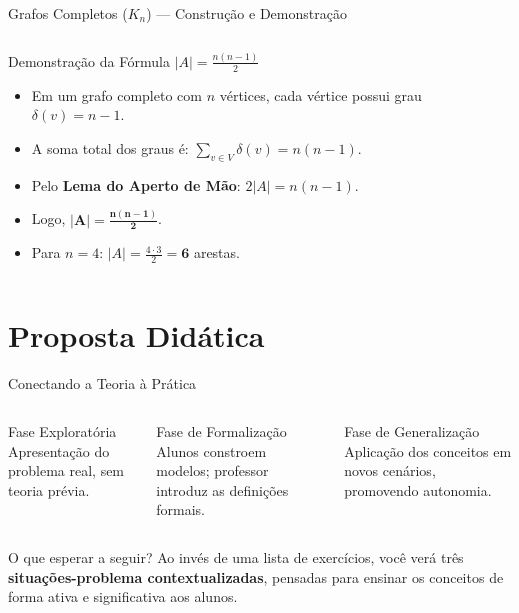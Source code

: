 \documentclass[10pt]{beamer}
\begin{document}
\begin{frame}{Grafos Completos ($K_n$) --- Constru\c{c}\~{a}o e Demonstra\c{c}\~{a}o}
\begin{columns}[T]
\scriptsize
\begin{block}{Demonstração da Fórmula $|A| = \frac{n(n-1)}{2}$}
\setlength{\itemsep}{0.15cm}
\begin{itemize}
    \item<2-> Em um grafo completo com $n$ vértices, cada vértice possui grau $\delta(v) = n-1$.
    \item<4-> A soma total dos graus é: $\displaystyle\sum_{v \in V} \delta(v) = n(n-1)$.
    \item<6-> Pelo \textbf{Lema do Aperto de Mão}: $2|A| = n(n-1)$.
    \item<8-> Logo, $\displaystyle \mathbf{|A| = \frac{n(n-1)}{2}}$.
    \item<10-> Para $n=4$: $|A| = \frac{4 \cdot 3}{2} = \mathbf{6}$ arestas.
\end{itemize}
\end{block}
\end{columns}
\end{frame}

\section{Proposta Did\'{a}tica}

\begin{frame}{Conectando a Teoria à Prática}
\transdissolve
\begin{columns}[T]
\begin{block}{\footnotesize Fase Exploratória}
\footnotesize
Apresentação do problema real, sem teoria prévia.
\end{block}
\begin{block}{\footnotesize Fase de Formalização}
\footnotesize
Alunos constroem modelos; professor introduz as definições formais.
\end{block}
\begin{block}{\footnotesize Fase de Generalização}
\footnotesize
Aplicação dos conceitos em novos cenários, promovendo autonomia.
\end{block}
\end{columns}
\vspace{0.4cm}
\begin{alertblock}{O que esperar a seguir?}
\centering
\small
Ao invés de uma lista de exercícios, você verá três \textbf{situações-problema contextualizadas}, pensadas para ensinar os conceitos de forma ativa e significativa aos alunos.
\end{alertblock}
\end{frame}
\end{document}
